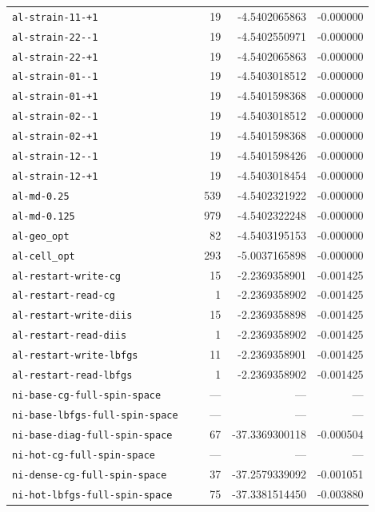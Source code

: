 \begin{longtable}{p{0.53\linewidth}rrr}
\nolinkurl{al-strain-11-+1} & 19 & -4.5402065863 & -0.000000\\
\nolinkurl{al-strain-22--1} & 19 & -4.5402550971 & -0.000000\\
\nolinkurl{al-strain-22-+1} & 19 & -4.5402065863 & -0.000000\\
\nolinkurl{al-strain-01--1} & 19 & -4.5403018512 & -0.000000\\
\nolinkurl{al-strain-01-+1} & 19 & -4.5401598368 & -0.000000\\
\nolinkurl{al-strain-02--1} & 19 & -4.5403018512 & -0.000000\\
\nolinkurl{al-strain-02-+1} & 19 & -4.5401598368 & -0.000000\\
\nolinkurl{al-strain-12--1} & 19 & -4.5401598426 & -0.000000\\
\nolinkurl{al-strain-12-+1} & 19 & -4.5403018454 & -0.000000\\
\nolinkurl{al-md-0.25} & 539 & -4.5402321922 & -0.000000\\
\nolinkurl{al-md-0.125} & 979 & -4.5402322248 & -0.000000\\
\nolinkurl{al-geo_opt} & 82 & -4.5403195153 & -0.000000\\
\nolinkurl{al-cell_opt} & 293 & -5.0037165898 & -0.000000\\
\nolinkurl{al-restart-write-cg} & 15 & -2.2369358901 & -0.001425\\
\nolinkurl{al-restart-read-cg} & 1 & -2.2369358902 & -0.001425\\
\nolinkurl{al-restart-write-diis} & 15 & -2.2369358898 & -0.001425\\
\nolinkurl{al-restart-read-diis} & 1 & -2.2369358902 & -0.001425\\
\nolinkurl{al-restart-write-lbfgs} & 11 & -2.2369358901 & -0.001425\\
\nolinkurl{al-restart-read-lbfgs} & 1 & -2.2369358902 & -0.001425\\
\nolinkurl{ni-base-cg-full-spin-space} & --- & --- & ---\\
\nolinkurl{ni-base-lbfgs-full-spin-space} & --- & --- & ---\\
\nolinkurl{ni-base-diag-full-spin-space} & 67 & -37.3369300118 & -0.000504\\
\nolinkurl{ni-hot-cg-full-spin-space} & --- & --- & ---\\
\nolinkurl{ni-dense-cg-full-spin-space} & 37 & -37.2579339092 & -0.001051\\
\nolinkurl{ni-hot-lbfgs-full-spin-space} & 75 & -37.3381514450 & -0.003880\\

\end{longtable}
